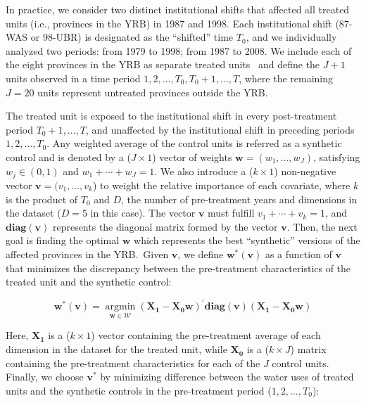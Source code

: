 In practice, we consider two distinct institutional shifts that affected all treated units (i.e., provinces in the YRB) in 1987 and 1998.
Each institutional shift (87-WAS or 98-UBR) is designated as the ``shifted'' time $T_0$, and we individually analyzed two periods: from 1979 to 1998; from 1987 to 2008.
We include each of the eight provinces in the YRB as separate treated units~\cite{abadie2021} and define the $J+1$ units observed in a time period $1, 2, \dots, T_0, T_0 + 1, \dots, T$, where the remaining $J=20$ units represent untreated provinces outside the YRB.\

The treated unit is exposed to the institutional shift in every post-treatment period $T_0 +1, \dots, T$, and unaffected by the institutional shift in preceding periods $1, 2, \dots, T_0$.
Any weighted average of the control units is referred as a synthetic control and is denoted by a ($J \times 1$) vector of weights $\mathbf{w} = (w_{1}, \ldots ,w_{J})$, satisfying $w_j \in (0, 1)$ and $w_1 + \cdots  + w_{J} = 1$.
We also introduce a ($k \times 1$) non-negative vector $\mathbf{v} = (v_{1}, \ldots ,v_{k}$) to weight the relative importance of each covariate, where $k$ is the product of $T_0$ and $D$, the number of pre-treatment years and dimensions in the dataset ($D = 5$ in this case).
The vector $\mathbf{v}$ must fulfill $v_1 + \cdots  + v_{k} = 1$, and $\mathbf{diag(v)}$ represents the diagonal matrix formed by the vector $\mathbf{v}$.
Then, the next goal is finding the optimal $\mathbf{w}$ which represents the best ``synthetic'' versions of the affected provinces in the YRB.\
Given $\mathbf{v}$, we define $\mathbf{w^{*}(v)}$ as a function of $\mathbf{v}$ that minimizes the discrepancy between the pre-treatment characteristics of the treated unit and the synthetic control:

\begin{equation}
    \mathbf{w^{*}(v)}=\underset{\mathbf{w} \in \mathcal{W}}{\operatorname{argmin}}\left(\mathbf{X}_{\mathbf{1}}-\mathbf{X}_{\mathbf{0}} \mathbf{w}\right)^{\prime} \mathbf{diag(v)}\left(\mathbf{X}_{\mathbf{1}}-\mathbf{X}_{\mathbf{0}} \mathbf{w}\right)
\end{equation}

Here, $\mathbf{X_1}$ is a ($k \times 1$) vector containing the pre-treatment average of each dimension in the dataset for the treated unit, while $\mathbf{X_0}$ is a ($k \times J$) matrix containing the pre-treatment characteristics for each of the $J$ control units.
Finally, we choose $\mathbf{v^{*}}$ by minimizing difference between the water uses of treated units and the synthetic controls in the pre-treatment period ($1, 2, \dots, T_0$):

